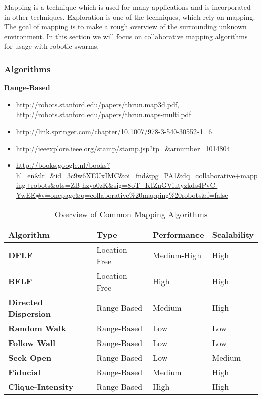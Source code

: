 Mapping is a technique which is used for many applications and is incorporated in other techniques. Exploration is one of the techniques, which rely on mapping. The goal of mapping is to make a rough overview of the surrounding unknown environment. In this section we will focus on collaborative mapping algorithms for usage with robotic swarms.

\subsubsection{Algorithms}

\textbf{Range-Based}\\
\begin{itemize}
  \item \url{http://robots.stanford.edu/papers/thrun.map3d.pdf}, \url{http://robots.stanford.edu/papers/thrun.maps-multi.pdf}
  \item \url{http://link.springer.com/chapter/10.1007/978-3-540-30552-1_6}
  \item \url{http://ieeexplore.ieee.org/stamp/stamp.jsp?tp=&arnumber=1014804}
  \item \url{http://books.google.nl/books?hl=en&lr=&id=3c9w6XEUxIMC&oi=fnd&pg=PA1&dq=collaborative+mapping+robots&ots=ZB-hzyo0zK&sig=8oT_KIZnGViutyzkds4PvC-YwEE#v=onepage&q=collaborative%20mapping%20robots&f=false}
\end{itemize}

  \begin{table}[H]
  \renewcommand{\arraystretch}{1.3}
  \label{table_alg_mapping}
  \caption{Overview of Common Mapping Algorithms}
  \centering
    \begin{tabular}{|l|l|l|l|}
    \hline
    \bfseries Algorithm & \bfseries Type & \bfseries Performance & \bfseries Scalability\\
    \hline
    \bfseries DFLF& Location-Free & Medium-High & High\\\hline
    \bfseries BFLF & Location-Free & High & High\\\hline
    \bfseries Directed Dispersion & Range-Based & Medium & High\\\hline
    \bfseries Random Walk& Range-Based & Low & Low\\\hline
    \bfseries Follow Wall& Range-Based & Low & Low\\\hline
    \bfseries Seek Open& Range-Based & Low & Medium\\\hline
    \bfseries Fiducial& Range-Based & Medium & High\\\hline
    \bfseries Clique-Intensity& Range-Based & High & High\\\hline
    \end{tabular}
  \end{table}

